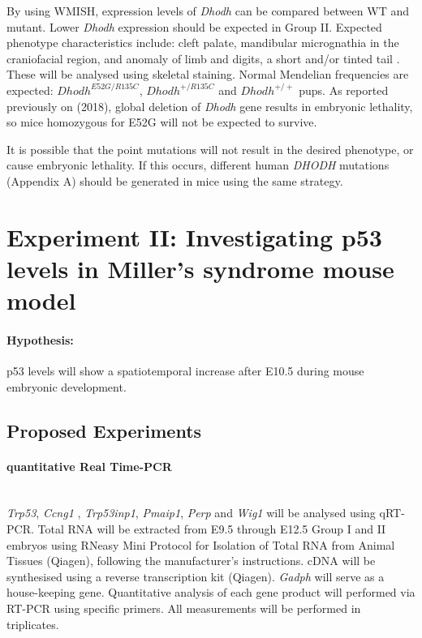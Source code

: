 \documentclass[12pt]{article}
\begin{document}
By using WMISH, expression levels of \textit{Dhodh} can be compared between WT and mutant. Lower \textit{Dhodh} expression should be expected in Group II.  Expected phenotype characteristics include: cleft palate, mandibular micrognathia in the craniofacial region, and anomaly of limb and digits, a short and/or tinted tail \citep{fukushima2009inhibiting}. These will be analysed using skeletal staining.  Normal Mendelian frequencies are expected: $Dhodh^{E52G/R135C}$, $Dhodh^{+/R135C}$ and  $Dhodh^{+/+}$ pups. As reported previously on \cite{mouse} (2018), global deletion of \textit{Dhodh} gene results in embryonic lethality, so mice homozygous for E52G will not be expected to survive.
 
It is possible that the point mutations will not result in the desired phenotype, or cause embryonic lethality. If this occurs, different human \textit{DHODH} mutations (Appendix A) should be generated in mice using the same strategy. 
 

\pagebreak

\section{Experiment II: Investigating p53 levels in Miller's syndrome mouse model}
\paragraph{Hypothesis:} p53 levels will show a spatiotemporal increase after E10.5 during mouse embryonic development.

\subsection{Proposed Experiments}
\paragraph{quantitative Real Time-PCR}
~\\\textit{Trp53}, \textit{Ccng1} , \textit{Trp53inp1}, \textit{Pmaip1}, \textit{Perp} and \textit{Wig1} will be analysed using qRT-PCR. Total RNA will be extracted from E9.5 through E12.5 Group I and II embryos using RNeasy Mini Protocol for Isolation of Total RNA from Animal Tissues (Qiagen), following the manufacturer's instructions. cDNA will be synthesised using a reverse transcription kit (Qiagen). \textit{Gadph} will serve as a house-keeping gene.  Quantitative analysis of each gene product will performed via RT-PCR using specific primers. All measurements will be performed in triplicates.
\end{document}

